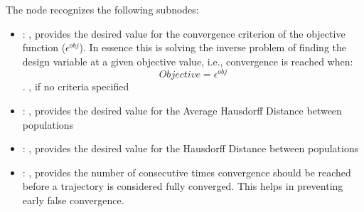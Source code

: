 \begin{itemize}
      The  node recognizes the following subnodes:
      \begin{itemize}
        \item {}: , 
          provides the desired value for the convergence criterion of the objective function
          ($\epsilon^{obj}$). In essence this is solving the inverse problem of finding the design
          variable                         at a given objective value, i.e., convergence is reached
          when: $$ Objective = \epsilon^{obj}$$.                        , if no
          criteria specified

        \item {}: , 
          provides the desired value for the Average Hausdorff Distance between populations

        \item {}: , 
          provides the desired value for the Hausdorff Distance between populations

        \item {}: , 
          provides the number of consecutive times convergence should be reached before a trajectory
          is considered fully converged. This helps in preventing early false convergence.
      \end{itemize}


\end{itemize}
